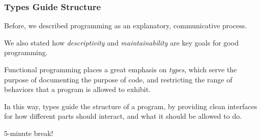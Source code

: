 \documentclass[aspectratio=169]{beamer}
\begin{document}
\begin{frame}[fragile]
  \frametitle{Types Guide Structure}

  Before, we described programming as an explanatory, communicative process.

  \pause
  \vspace{\fill}

  We also stated how \textit{descriptivity} and \textit{maintainability} are 
  key goals for good programming.

  \pause
  \vspace{\fill}

  Functional programming places a great emphasis on \textit{types}, which serve 
  the purpose of documenting the purpose of code, and restricting the range of 
  behaviors that a program is allowed to exhibit.
  
  \pause
  \vspace{\fill}

  In this way, types guide the structure of a program, by providing clean interfaces
  for how different parts should interact, and what it should be allowed to do. 

\end{frame}




\begin{frame}[plain]

  \begin{center}
    \Large 5-minute break!
  \end{center}

\end{frame}

\end{document}
